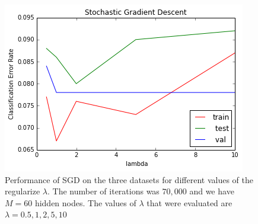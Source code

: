 \documentclass[10pt]{article}
\begin{document}
\begin{figure}
\centering
\includegraphics[scale=0.5]{SGD_minist_CER_lambda.png}
\caption{Performance of SGD on the three datasets for different values of the regularize $\lambda$. The number of iterations was $70,000$ and we have $M = 60$ hidden nodes. The values of $\lambda$ that were evaluated are $\lambda = {0.5, 1, 2, 5, 10}$}
\label{SGD_minist_CER_lambda}
\end{figure}
\end{document}
